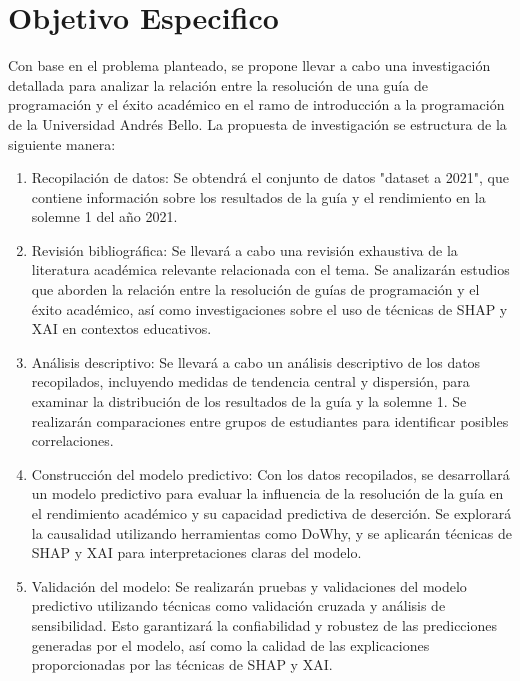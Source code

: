 \hypertarget{objetivo_especifico}{%
    \section{Objetivo Especifico}\label{Objetivo Especifico}}

Con base en el problema planteado, se propone llevar a cabo una investigación detallada para analizar la relación entre la resolución de una guía de programación y el éxito académico en el ramo de introducción a la programación de la Universidad Andrés Bello. La propuesta de investigación se estructura de la siguiente manera:

\begin{enumerate}
    \item Recopilación de datos: Se obtendrá el conjunto de datos "dataset a 2021", que contiene información sobre los resultados de la guía y el rendimiento en la solemne 1 del año 2021.

    \item Revisión bibliográfica: Se llevará a cabo una revisión exhaustiva de la literatura académica relevante relacionada con el tema. Se analizarán estudios que aborden la relación entre la resolución de guías de programación y el éxito académico, así como investigaciones sobre el uso de técnicas de SHAP y XAI en contextos educativos.


    \item Análisis descriptivo: Se llevará a cabo un análisis descriptivo de los datos recopilados, incluyendo medidas de tendencia central y dispersión, para examinar la distribución de los resultados de la guía y la solemne 1. Se realizarán comparaciones entre grupos de estudiantes para identificar posibles correlaciones.

    \item Construcción del modelo predictivo: Con los datos recopilados, se desarrollará un modelo predictivo para evaluar la influencia de la resolución de la guía en el rendimiento académico y su capacidad predictiva de deserción. Se explorará la causalidad utilizando herramientas como DoWhy, y se aplicarán técnicas de SHAP y XAI para interpretaciones claras del modelo.

    \item Validación del modelo: Se realizarán pruebas y validaciones del modelo predictivo utilizando técnicas como validación cruzada y análisis de sensibilidad. Esto garantizará la confiabilidad y robustez de las predicciones generadas por el modelo, así como la calidad de las explicaciones proporcionadas por las técnicas de SHAP y XAI.


\end{enumerate}
